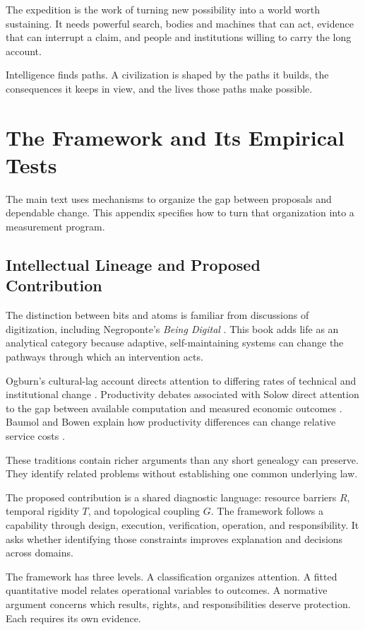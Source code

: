 \documentclass[11pt,openany]{book}
\begin{document}
The expedition is the work of turning new possibility into a world worth sustaining. It needs powerful search, bodies and machines that can act, evidence that can interrupt a claim, and people and institutions willing to carry the long account.

Intelligence finds paths. A civilization is shaped by the paths it builds, the consequences it keeps in view, and the lives those paths make possible.

\appendix
\chapter{The Framework and Its Empirical Tests}

The main text uses mechanisms to organize the gap between proposals and dependable change. This appendix specifies how to turn that organization into a measurement program.

\section{Intellectual Lineage and Proposed Contribution}

The distinction between bits and atoms is familiar from discussions of digitization, including Negroponte's \textit{Being Digital} \cite{negroponte1995being}. This book adds life as an analytical category because adaptive, self-maintaining systems can change the pathways through which an intervention acts.

Ogburn's cultural-lag account directs attention to differing rates of technical and institutional change \cite{ogburn1922social}. Productivity debates associated with Solow direct attention to the gap between available computation and measured economic outcomes \cite{solow1987watch}. Baumol and Bowen explain how productivity differences can change relative service costs \cite{baumol1966performing,baumol1967macro}.

These traditions contain richer arguments than any short genealogy can preserve. They identify related problems without establishing one common underlying law.

The proposed contribution is a shared diagnostic language: resource barriers $R$, temporal rigidity $T$, and topological coupling $G$. The framework follows a capability through design, execution, verification, operation, and responsibility. It asks whether identifying those constraints improves explanation and decisions across domains.

The framework has three levels. A classification organizes attention. A fitted quantitative model relates operational variables to outcomes. A normative argument concerns which results, rights, and responsibilities deserve protection. Each requires its own evidence.
\end{document}
